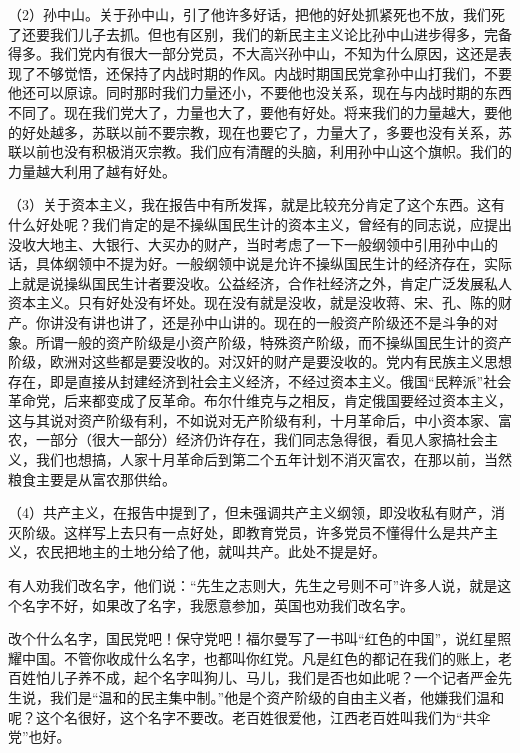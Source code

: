 （2）孙中山。关于孙中山，引了他许多好话，把他的好处抓紧死也不放，我们死了还要我们儿子去抓。但也有区别，我们的新民主主义论比孙中山进步得多，完备得多。我们党内有很大一部分党员，不大高兴孙中山，不知为什么原因，这还是表现了不够觉悟，还保持了内战时期的作风。内战时期国民党拿孙中山打我们，不要他还可以原谅。同时那时我们力量还小，不要他也没关系，现在与内战时期的东西不同了。现在我们党大了，力量也大了，要他有好处。将来我们的力量越大，要他的好处越多，苏联以前不要宗教，现在也要它了，力量大了，多要也没有关系，苏联以前也没有积极消灭宗教。我们应有清醒的头脑，利用孙中山这个旗帜。我们的力量越大利用了越有好处。

（3）关于资本主义，我在报告中有所发挥，就是比较充分肯定了这个东西。这有什么好处呢？我们肯定的是不操纵国民生计的资本主义，曾经有的同志说，应提出没收大地主、大银行、大买办的财产，当时考虑了一下一般纲领中引用孙中山的话，具体纲领中不提为好。一般纲领中说是允许不操纵国民生计的经济存在，实际上就是说操纵国民生计者要没收。公益经济，合作社经济之外，肯定广泛发展私人资本主义。只有好处没有坏处。现在没有就是没收，就是没收蒋、宋、孔、陈的财产。你讲没有讲也讲了，还是孙中山讲的。现在的一般资产阶级还不是斗争的对象。所谓一般的资产阶级是小资产阶级，特殊资产阶级，而不操纵国民生计的资产阶级，欧洲对这些都是要没收的。对汉奸的财产是要没收的。党内有民族主义思想存在，即是直接从封建经济到社会主义经济，不经过资本主义。俄国“民粹派”社会革命党，后来都变成了反革命。布尔什维克与之相反，肯定俄国要经过资本主义，这与其说对资产阶级有利，不如说对无产阶级有利，十月革命后，中小资本家、富农，一部分（很大一部分）经济仍许存在，我们同志急得很，看见人家搞社会主义，我们也想搞，人家十月革命后到第二个五年计划不消灭富农，在那以前，当然粮食主要是从富农那供给。

（4）共产主义，在报告中提到了，但未强调共产主义纲领，即没收私有财产，消灭阶级。这样写上去只有一点好处，即教育党员，许多党员不懂得什么是共产主义，农民把地主的土地分给了他，就叫共产。此处不提是好。

有人劝我们改名字，他们说：“先生之志则大，先生之号则不可”许多人说，就是这个名字不好，如果改了名字，我愿意参加，英国也劝我们改名字。

改个什么名字，国民党吧！保守党吧！福尔曼写了一书叫“红色的中国”，说红星照耀中国。不管你收成什么名字，也都叫你红党。凡是红色的都记在我们的账上，老百姓怕儿子养不成，起个名字叫狗儿、马儿，我们是否也如此呢？一个记者严金先生说，我们是“温和的民主集中制。”他是个资产阶级的自由主义者，他嫌我们温和呢？这个名很好，这个名字不要改。老百姓很爱他，江西老百姓叫我们为“共伞党”也好。

